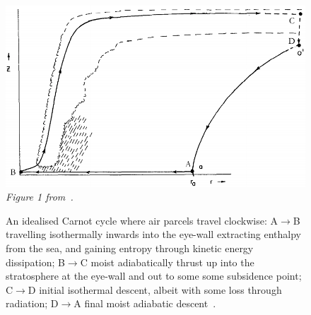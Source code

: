 \begin{figure}
\centering
    \includegraphics[width=\linewidth]{images/hurricane-carnot.png}\\
    \textit{Figure 1 from~\cite{emanuel1991theory}. }
    \caption{An idealised Carnot cycle where air parcels travel clockwise:
            A$\rightarrow$B travelling isothermally inwards into the eye-wall extracting enthalpy
            from the sea, and gaining entropy through kinetic energy dissipation;
            B$\rightarrow$C moist adiabatically thrust up into the stratosphere
            at the eye-wall and out to some some subsidence point;
            C$\rightarrow$D initial isothermal descent, albeit with some loss through radiation;
            D$\rightarrow$A final moist adiabatic descent~\cite{emanuel2018progress}. }
            \label{fig:hurricane-carnot}

\end{figure}
